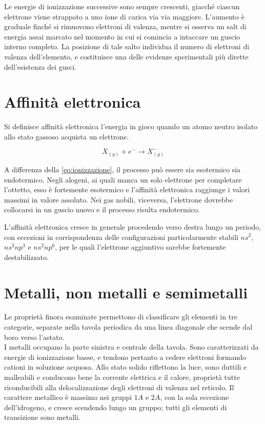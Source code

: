 Le energie di ionizzazione successive sono sempre crescenti, giacché ciascun elettrone viene strappato a uno ione di carica via via maggiore. 
L'aumento è graduale finché si rimuovono elettroni di valenza, mentre si osserva un salt di energia assai marcato nel momento in cui si comincia a intaccare un guscio interno completo. La posizione di tale salto individua il numero di elettroni di valenza dell'elemento, e costituisce una delle evidenze sperimentali più dirette dell'esistenza dei gusci.

\newpage

\section{Affinità elettronica}

Si definisce affinità elettronica l'energia in gioco quando un atomo neutro isolato allo stato gassoso acquista un elettrone.

\begin{equation}
    X_{(g)} + e^- \longrightarrow X^-_{(g)}
    \label{eq:affinita}
\end{equation}

A differenza della \eqref{eq:ionizzazione}, il processo può essere sia esotermico sia endotermico. Negli alogeni, ai quali manca un solo elettrone per completare l'ottetto, esso è fortemente esotermico e l'affinità elettronica raggiunge i valori massimi in valore assoluto. 
Nei gas nobili, viceversa, l'elettrone dovrebbe collocarsi in un guscio nuovo e il processo risulta endotermico.

L'affinità elettronica cresce in generale procedendo verso destra lungo un periodo, con eccezioni in corrispondenza delle configurazioni particolarmente stabili $ns^2$, $ns^2np^3$ e $ns^2np^6$, per le quali l'elettrone aggiuntivo sarebbe fortemente destabilizzato.

\section{Metalli, non metalli e semimetalli}

Le proprietà finora esaminate permettono di classificare gli elementi in tre categorie, separate nella tavola periodica da una linea diagonale che scende dal boro verso l'astato.\\

I metalli occupano la parte sinistra e centrale della tavola. Sono caratterizzati da energie di ionizzazione basse, e tendono pertanto a cedere elettroni formando cationi in soluzione acquosa. 
Allo stato solido riflettono la luce, sono duttili e malleabili e conducono bene la corrente elettrica e il calore, proprietà tutte riconducibili alla delocalizzazione degli elettroni di valenza nel reticolo. 
Il carattere metallico è massimo nei gruppi $1A$ e $2A$, con la sola eccezione dell'idrogeno, e cresce scendendo lungo un gruppo; tutti gli elementi di transizione sono metalli.\\

